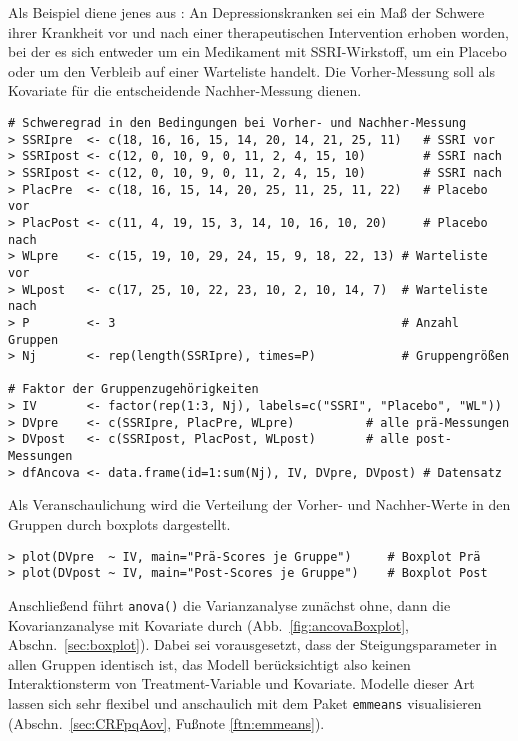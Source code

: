 Als Beispiel diene jenes aus : An Depressionskranken sei ein Maß der Schwere ihrer Krankheit vor und nach einer therapeutischen Intervention erhoben worden, bei der es sich entweder um ein Medikament mit SSRI-Wirkstoff, um ein Placebo oder um den Verbleib auf einer Warteliste handelt. Die Vorher-Messung soll als Kovariate für die entscheidende Nachher-Messung dienen.
\begin{lstlisting}
# Schweregrad in den Bedingungen bei Vorher- und Nachher-Messung
> SSRIpre  <- c(18, 16, 16, 15, 14, 20, 14, 21, 25, 11)   # SSRI vor
> SSRIpost <- c(12, 0, 10, 9, 0, 11, 2, 4, 15, 10)        # SSRI nach
> SSRIpost <- c(12, 0, 10, 9, 0, 11, 2, 4, 15, 10)        # SSRI nach
> PlacPre  <- c(18, 16, 15, 14, 20, 25, 11, 25, 11, 22)   # Placebo vor
> PlacPost <- c(11, 4, 19, 15, 3, 14, 10, 16, 10, 20)     # Placebo nach
> WLpre    <- c(15, 19, 10, 29, 24, 15, 9, 18, 22, 13) # Warteliste vor
> WLpost   <- c(17, 25, 10, 22, 23, 10, 2, 10, 14, 7)  # Warteliste nach
> P        <- 3                                        # Anzahl Gruppen
> Nj       <- rep(length(SSRIpre), times=P)            # Gruppengrößen

# Faktor der Gruppenzugehörigkeiten
> IV       <- factor(rep(1:3, Nj), labels=c("SSRI", "Placebo", "WL"))
> DVpre    <- c(SSRIpre, PlacPre, WLpre)          # alle prä-Messungen
> DVpost   <- c(SSRIpost, PlacPost, WLpost)       # alle post-Messungen
> dfAncova <- data.frame(id=1:sum(Nj), IV, DVpre, DVpost) # Datensatz
\end{lstlisting}

Als Veranschaulichung wird die Verteilung der Vorher- und Nachher-Werte in den Gruppen durch boxplots dargestellt.
\begin{lstlisting}
> plot(DVpre  ~ IV, main="Prä-Scores je Gruppe")     # Boxplot Prä
> plot(DVpost ~ IV, main="Post-Scores je Gruppe")    # Boxplot Post
\end{lstlisting}

Anschließend führt \lstinline!anova()! die Varianzanalyse zunächst ohne, dann die Kovarianzanalyse mit Kovariate durch (Abb.\ \ref{fig:ancovaBoxplot}, Abschn.\ \ref{sec:boxplot}). Dabei sei vorausgesetzt, dass der Steigungsparameter in allen Gruppen identisch ist, das Modell berücksichtigt also keinen Interaktionsterm von Treatment-Variable und Kovariate. Modelle dieser Art lassen sich sehr flexibel und anschaulich mit dem Paket \lstinline!emmeans! visualisieren (Abschn.\ \ref{sec:CRFpqAov}, Fußnote \ref{ftn:emmeans}).

